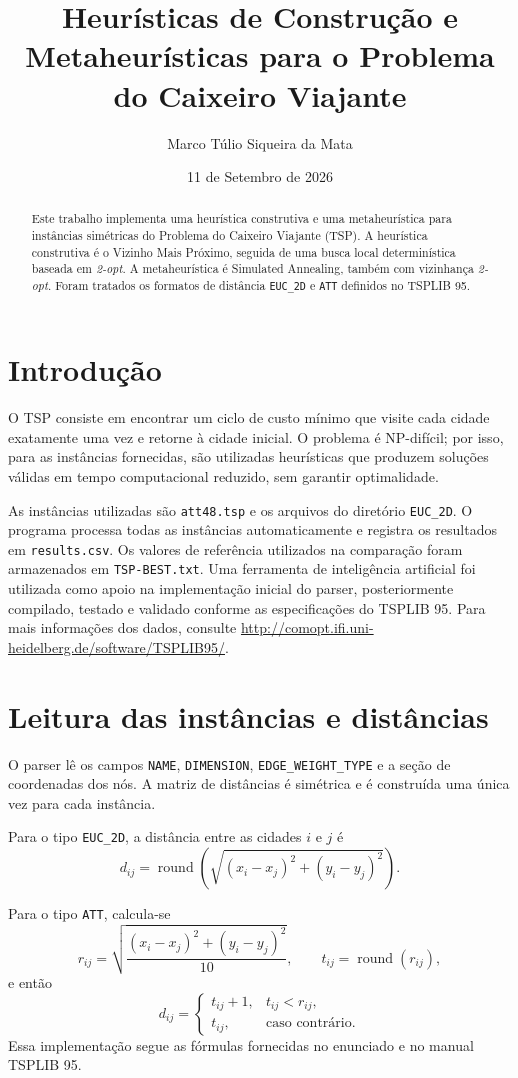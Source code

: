 \documentclass[12pt,a4paper]{article}
\title{Heurísticas de Construção e Metaheurísticas para o Problema do Caixeiro Viajante}
\author[1]{Marco Túlio Siqueira da Mata}
\affil[1]{PPGCC UFMG}
\date{11 de Setembro de 2026}
\begin{document}
\maketitle

\begin{abstract}
Este trabalho implementa uma heurística construtiva e uma metaheurística para instâncias simétricas do Problema do Caixeiro Viajante (TSP). A heurística construtiva é o Vizinho Mais Próximo, seguida de uma busca local determinística baseada em \textit{2-opt}. A metaheurística é Simulated Annealing, também com vizinhança \textit{2-opt}. Foram tratados os formatos de distância \texttt{EUC\_2D} e \texttt{ATT} definidos no TSPLIB 95.
\end{abstract}

\section{Introdução}
O TSP consiste em encontrar um ciclo de custo mínimo que visite cada cidade exatamente uma vez e retorne à cidade inicial. O problema é NP-difícil; por isso, para as instâncias fornecidas, são utilizadas heurísticas que produzem soluções válidas em tempo computacional reduzido, sem garantir optimalidade.

As instâncias utilizadas são \texttt{att48.tsp} e os arquivos do diretório \texttt{EUC\_2D}. O programa processa todas as instâncias automaticamente e registra os resultados em \texttt{results.csv}. Os valores de referência utilizados na comparação foram armazenados em \texttt{TSP-BEST.txt}. Uma ferramenta de inteligência artificial foi utilizada como apoio na implementação inicial do parser, posteriormente compilado, testado e validado conforme as especificações do TSPLIB 95. Para mais informações dos dados, consulte \url{http://comopt.ifi.uni-heidelberg.de/software/TSPLIB95/}.

\section{Leitura das instâncias e distâncias}
O parser lê os campos \texttt{NAME}, \texttt{DIMENSION}, \texttt{EDGE\_WEIGHT\_TYPE} e a seção de coordenadas dos nós. A matriz de distâncias é simétrica e é construída uma única vez para cada instância.

Para o tipo \texttt{EUC\_2D}, a distância entre as cidades $i$ e $j$ é
\[
 d_{ij}=\operatorname{round}\left(\sqrt{(x_i-x_j)^2+(y_i-y_j)^2}\right).
\]

Para o tipo \texttt{ATT}, calcula-se
\[
 r_{ij}=\sqrt{\frac{(x_i-x_j)^2+(y_i-y_j)^2}{10}},
 \qquad t_{ij}=\operatorname{round}(r_{ij}),
\]
e então
\[
 d_{ij}=\begin{cases}
 t_{ij}+1, & t_{ij}<r_{ij},\\
 t_{ij}, & \text{caso contrário.}
 \end{cases}
\]
Essa implementação segue as fórmulas fornecidas no enunciado e no manual TSPLIB 95.
\end{document}
